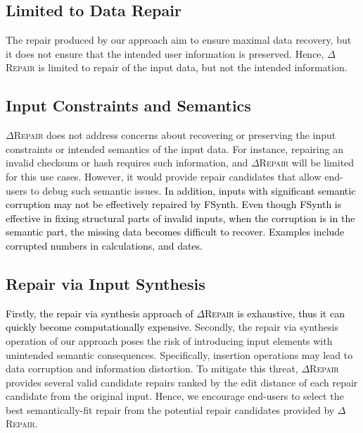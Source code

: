 \documentclass[acmsmall,screen,review,anonymous]{acmart}
\newcounter{todocounter}
\newcommand{\done}[1]{\marginpar{$*$}\textcolor{green}{\stepcounter{todocounter}\footnote[\thetodocounter]{\textcolor{black}{\textbf{DONE }}\textit{#1}}}}
\newcommand{\revise}[1]{\textcolor{black}{#1}}
\renewcommand{\done}[1]{} %
\renewcommand{\done}[1]{}
\newcommand{\approach}{\textsc{$\Delta$Repair}\xspace}
\begin{document}
\subsection{Limited to Data Repair} The repair produced by our approach aim to ensure maximal data recovery, but it does not ensure that the intended user information is preserved. Hence, \approach is limited to repair of the input data, but not the intended information. 


\subsection{Input Constraints and Semantics} \approach does not address concerns about recovering or preserving the input constraints or intended semantics of the input data. For instance, repairing an invalid checksum or hash requires such information, and \approach will be limited for this use cases. However, it would provide repair candidates that allow end-users to debug such semantic issues. 
\revise{
In addition, inputs with significant semantic corruption may not be effectively repaired by FSynth. Even though FSynth is effective in fixing structural parts of invalid inputs, when the corruption is in the semantic part, the missing data becomes difficult to recover. Examples include corrupted numbers in calculations, and dates.}


\subsection{Repair via Input Synthesis} 
\revise{Firstly, the repair via synthesis approach of \approach is exhaustive, thus it can quickly become computationally expensive.} 
Secondly, the repair via synthesis operation %
of our approach poses the risk of introducing input elements with unintended semantic consequences. 
Specifically, insertion operations may lead %
to data corruption and information distortion. To mitigate this threat, \approach provides several valid candidate repairs ranked by the edit distance 
of each repair candidate from the original input. %
Hence, we 
encourage end-users to select the best semantically-fit repair from the 
potential repair candidates provided by \approach. 


\done{Do you talk about the risk of input synthesis (which may be perceived as greater than the risk of input deletion) somewhere? A small lexical change may have large semantical consequences -- AZ}
\end{document}
